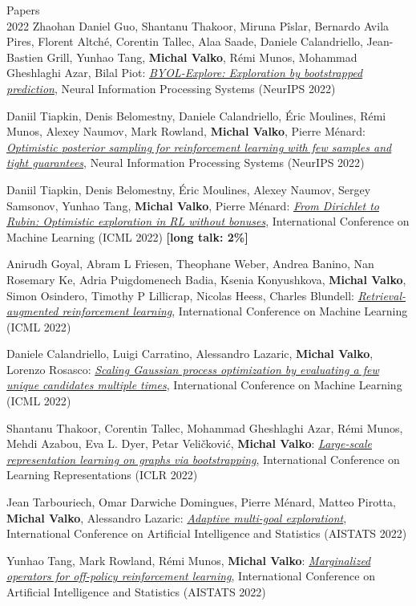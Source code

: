 \documentclass{resume}
\begin{document}
\begin{category}{Papers\\2022}
\citembullet
Zhaohan Daniel Guo, Shantanu Thakoor, Miruna P\^islar, Bernardo Avila Pires, Florent Altch\' e, Corentin Tallec, Alaa Saade, Daniele Calandriello, Jean-Bastien Grill, Yunhao Tang,  {\bf Michal Valko}, R\' emi Munos, Mohammad Gheshlaghi Azar, Bilal Piot:   
\href{https://arxiv.org/pdf/2206.08332.pdf}
{\emph{BYOL-Explore: Exploration by bootstrapped prediction}},
Neural Information Processing Systems
({\sf NeurIPS 2022}) 

\citembullet
Daniil Tiapkin, Denis Belomestny, Daniele Calandriello, \' Eric Moulines, R\' emi Munos, Alexey Naumov, Mark Rowland, {\bf Michal Valko}, Pierre M\' enard: 
\href{https://arxiv.org/pdf/2209.14414.pdf} 
{\emph{Optimistic posterior sampling for reinforcement learning with few samples and tight guarantees}},
Neural Information Processing Systems
({\sf NeurIPS 2022}) 

\citembullet
Daniil Tiapkin, Denis Belomestny, \' Eric Moulines, Alexey Naumov, Sergey Samsonov, Yunhao Tang, {\bf Michal Valko}, Pierre M\' enard:   
\href{https://arxiv.org/pdf/2205.07704.pdf}
{\emph{From Dirichlet to Rubin: Optimistic exploration in RL without bonuses}},
International Conference on Machine Learning
({\sf ICML 2022})  {\bf [long talk: 2\%]}


\citembullet
Anirudh Goyal, Abram L Friesen, Theophane Weber, Andrea Banino, Nan Rosemary Ke, Adria Puigdomenech Badia, Ksenia Konyushkova,  {\bf Michal Valko}, Simon Osindero, Timothy P Lillicrap, Nicolas Heess, Charles Blundell:
\href{https://arxiv.org/pdf/2202.08417.pdf}
{\emph{Retrieval-augmented reinforcement learning}},
International Conference on Machine Learning
({\sf ICML 2022}) 


\citembullet
Daniele Calandriello, Luigi Carratino, Alessandro Lazaric,  {\bf Michal Valko}, Lorenzo Rosasco:
\href{https://arxiv.org/pdf/2201.12909.pdf}
{\emph{Scaling Gaussian process optimization by evaluating a few unique candidates multiple times}},
International Conference on Machine Learning
({\sf ICML 2022}) 



\citembullet
Shantanu Thakoor, Corentin Tallec, Mohammad Gheshlaghi Azar, R\' emi Munos,  Mehdi Azabou, Eva L. Dyer, Petar Veličković, {\bf Michal Valko}:
\href{https://arxiv.org/pdf/2102.06514.pdf}{\emph{Large-scale representation learning on graphs via bootstrapping}},
International Conference on Learning Representations
({\sf ICLR 2022}) 


\citembullet
Jean Tarbouriech, Omar Darwiche Domingues, Pierre M\' enard, Matteo Pirotta, {\bf Michal Valko}, Alessandro Lazaric: 
\href{https://arxiv.org/abs/2111.12045.pdf}{\emph{Adaptive multi-goal explorationt}},
International Conference on Artificial Intelligence and Statistics
({\sf AISTATS 2022}) 

\citembullet
Yunhao Tang, Mark Rowland, R\' emi Munos,  {\bf Michal Valko}: 
\href{https://arxiv.org/pdf/2203.16177.pdf}{\emph{Marginalized operators for off-policy reinforcement learning}}, International Conference on Artificial Intelligence and Statistics
({\sf AISTATS 2022}) 
\end{category}
\end{document}

